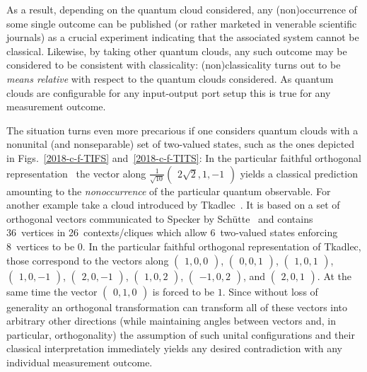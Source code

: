 \documentclass[%
  reprint,
  twocolumn,
 showpacs,
 showkeys,
 preprintnumbers,
 amsmath,amssymb,
 aps,
  prl,
  longbibliography,
 ]{revtex4-1}
\begin{document}
As a result, depending on the quantum cloud considered, any (non)occurrence of some single outcome can be published
(or rather marketed in venerable scientific journals)
as a crucial experiment indicating that the associated system cannot be classical.
Likewise, by taking other quantum clouds, any such outcome may be considered to be consistent with classicality:
(non)classicality turns out to be {\em means relative} with respect to the quantum clouds considered.
As quantum clouds are configurable for any input-output port setup this is true for any measurement outcome.


The situation turns even more precarious if one considers quantum clouds with a nonunital (and nonseparable) set of two-valued states,
such as the ones
depicted in Figs.~\ref{2018-c-f-TIFS} and~\ref{2018-c-f-TITS}:
In the particular faithful orthogonal
representation~\cite[Table~1, p.~102201-7]{2015-AnalyticKS}
the vector along
$\frac{1}{\sqrt{10}}\begin{pmatrix} 2\sqrt{2},1,-1 \end{pmatrix}$
yields a classical prediction amounting to the {\em nonoccurrence} of the particular
quantum observable. For another example
take a cloud introduced by Tkadlec~\cite[Fig.~2]{tkadlec-96}.
It is based on a set of orthogonal vectors
communicated to Specker by Sch\"utte~\cite{clavadetscher} and contains
36~vertices in 26~contexts/cliques which allow 6~two-valued states
enforcing 8~vertices to be $0$. In the particular faithful orthogonal representation of Tkadlec,
those correspond to the vectors along
$\begin{pmatrix} 1,0,0 \end{pmatrix}$,
$\begin{pmatrix} 0,0,1 \end{pmatrix}$,
$\begin{pmatrix} 1,0,1 \end{pmatrix}$,
$\begin{pmatrix} 1,0,-1 \end{pmatrix}$,
$\begin{pmatrix} 2,0,-1 \end{pmatrix}$,
$\begin{pmatrix} 1,0,2 \end{pmatrix}$,
$\begin{pmatrix} -1,0,2 \end{pmatrix}$, and
$\begin{pmatrix} 2,0,1 \end{pmatrix}$.
At the same time the vector
$\begin{pmatrix} 0,1,0 \end{pmatrix}$ is forced to be $1$.
Since without loss of generality an orthogonal transformation can transform all of
these vectors into arbitrary other directions (while maintaining angles between vectors and,
in particular, orthogonality)
the assumption of such unital configurations
and their classical interpretation
immediately yields any desired contradiction
with any individual measurement outcome.
\end{document}
